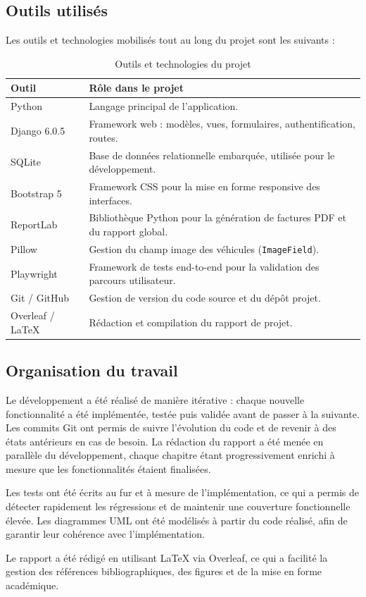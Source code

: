 \subsection{Outils utilisés}
Les outils et technologies mobilisés tout au long du projet sont les suivants :

\begin{table}[H]
\centering
\caption{Outils et technologies du projet}
\begin{tabularx}{\textwidth}{|l|X|}
\hline
\textbf{Outil} & \textbf{Rôle dans le projet} \\
\hline
Python \cite{python} & Langage principal de l'application. \\
\hline
Django 6.0.5 \cite{django} & Framework web : modèles, vues, formulaires, authentification, routes. \\
\hline
SQLite \cite{sqlite} & Base de données relationnelle embarquée, utilisée pour le développement. \\
\hline
Bootstrap 5 \cite{bootstrap} & Framework CSS pour la mise en forme responsive des interfaces. \\
\hline
ReportLab \cite{reportlab} & Bibliothèque Python pour la génération de factures PDF et du rapport global. \\
\hline
Pillow & Gestion du champ image des véhicules (\texttt{ImageField}). \\
\hline
Playwright \cite{playwright} & Framework de tests end-to-end pour la validation des parcours utilisateur. \\
\hline
Git / GitHub & Gestion de version du code source et du dépôt projet. \\
\hline
Overleaf / LaTeX & Rédaction et compilation du rapport de projet. \\
\hline
\end{tabularx}
\end{table}

\subsection{Organisation du travail}
Le développement a été réalisé de manière itérative : chaque nouvelle fonctionnalité a été implémentée, testée puis validée avant de passer à la suivante. Les commits Git ont permis de suivre l'évolution du code et de revenir à des états antérieurs en cas de besoin. La rédaction du rapport a été menée en parallèle du développement, chaque chapitre étant progressivement enrichi à mesure que les fonctionnalités étaient finalisées.

Les tests ont été écrits au fur et à mesure de l'implémentation, ce qui a permis de détecter rapidement les régressions et de maintenir une couverture fonctionnelle élevée. Les diagrammes UML ont été modélisés à partir du code réalisé, afin de garantir leur cohérence avec l'implémentation.

Le rapport a été rédigé en utilisant LaTeX via Overleaf, ce qui a facilité la gestion des références bibliographiques, des figures et de la mise en forme académique.

\clearpage
